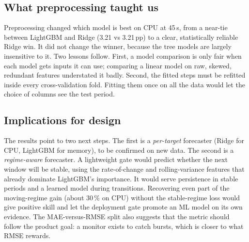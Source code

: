 \documentclass[conference]{IEEEtran}
\newcommand{\pp}{\,pp}
\begin{document}
\subsection{What preprocessing taught us}
Preprocessing changed which model is best on CPU at 45\,s, from a near-tie
between LightGBM and Ridge (3.21 vs 3.21\pp) to a clear, statistically
reliable Ridge win. It did not
change the winner, because the tree models are largely insensitive to it.
Two lessons follow. First, a model comparison is only fair when each model gets
inputs it can use; comparing a linear model on raw, skewed, redundant features
understated it badly. Second, the fitted steps must be refitted inside every
cross-validation fold. Fitting them once on all the data would let the choice
of columns see the test period.

\subsection{Implications for design}
The results point to two next steps. The first is a \emph{per-target}
forecaster (Ridge for CPU, LightGBM for memory), to be confirmed on new data.
The second is a \emph{regime-aware} forecaster. A lightweight gate would
predict whether the next window will be stable, using the rate-of-change and
rolling-variance features that already dominate LightGBM's importance. It
would serve persistence in stable periods and a learned model during
transitions. Recovering even part of the moving-regime gain (about 30\,\% on
CPU) without the stable-regime loss would give positive skill and let the
deployment gate promote an ML model on its own evidence. The MAE-versus-RMSE
split also suggests that the metric should follow the product goal: a monitor
exists to catch bursts, which is closer to what RMSE rewards.
\end{document}
